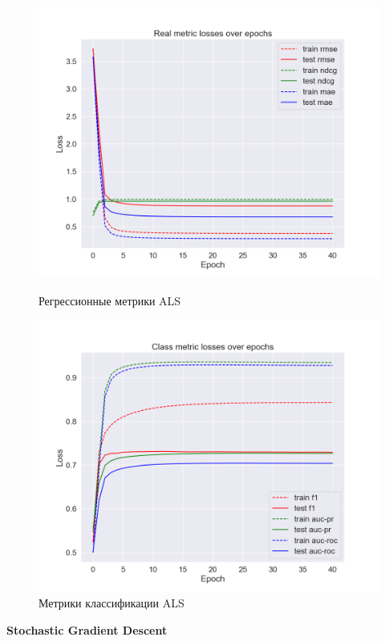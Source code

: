 \begin{figure}[h!]
\centering
\begin{minipage}{.5\textwidth}
\centering
\includegraphics[width=0.9\linewidth]{images/als/real_losses}
\caption{Регрессионные метрики ALS}
\label{fig:als_real_losses}
\end{minipage}%
\begin{minipage}{.5\textwidth}
\centering
\includegraphics[width=0.9\linewidth]{images/als/class_losses}
\caption{Метрики классификации ALS}
\label{fig:als_class_losses}
\end{minipage}
\end{figure}


\vspace{1em}
\textbf{Stochastic Gradient Descent}


